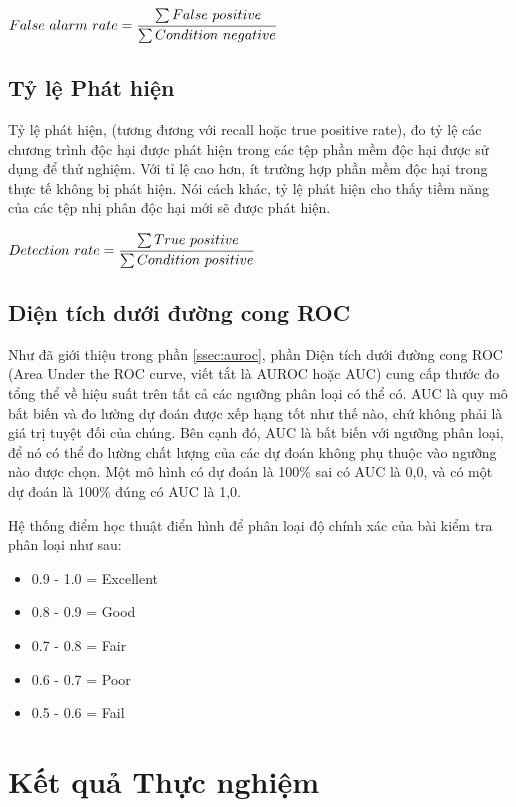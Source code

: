 \begin{center}
    ${False\ alarm\ rate} =  \cfrac{\sum False\ positive}{\sum Condition\ negative}$
\end{center}

\subsection{Tỷ lệ Phát hiện}

Tỷ lệ phát hiện, (tương đương với recall hoặc true positive rate), đo tỷ lệ các chương trình độc hại được phát hiện trong các tệp phần mềm độc hại được sử dụng để thử nghiệm. Với tỉ lệ cao hơn, ít trường hợp phần mềm độc hại trong thực tế không bị phát hiện. Nói cách khác, tỷ lệ phát hiện cho thấy tiềm năng của các tệp nhị phân độc hại mới sẽ được phát hiện.

\begin{center}
    ${Detection\ rate} =  \cfrac{\sum True\ positive}{\sum Condition\ positive}$
\end{center}

\subsection{Diện tích dưới đường cong ROC}

Như đã giới thiệu trong phần \ref{ssec:auroc}, phần Diện tích dưới đường cong ROC (Area Under the ROC curve, viết tắt là AUROC hoặc AUC) cung cấp thước đo tổng thể về hiệu suất trên tất cả các ngưỡng phân loại có thể có.
AUC là quy mô bất biến và đo lường dự đoán được xếp hạng tốt như thế nào, chứ không phải là giá trị tuyệt đối của chúng.
Bên cạnh đó, AUC là bất biến với ngưỡng phân loại, để nó có thể đo lường chất lượng của các dự đoán không phụ thuộc vào ngưỡng nào được chọn.
Một mô hình có dự đoán là 100\% sai có AUC là 0,0, và có một dự đoán là 100\% đúng có AUC là 1,0.

Hệ thống điểm học thuật điển hình để phân loại độ chính xác của bài kiểm tra phân loại như sau:

\begin{itemize}
\item 0.9 - 1.0 = Excellent
\item 0.8 - 0.9 = Good
\item 0.7 - 0.8 = Fair
\item 0.6 - 0.7 = Poor
\item 0.5 - 0.6 = Fail
\end{itemize}

\section{Kết quả Thực nghiệm}

